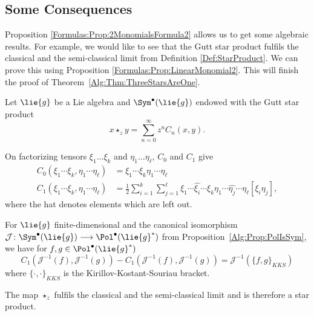 \subsection{Some Consequences}
Proposition \ref{Formulas:Prop:2MonomialsFormula2} allows us to get some 
algebraic results. For example, we would like to see that the Gutt star 
product fulfils the classical and the semi-classical limit from Definition 
\ref{Def:StarProduct}. We can prove this using Proposition 
\ref{Formulas:Prop:LinearMonomial2}. This will finish the proof of 
Theorem~\ref{Alg:Thm:ThreeStarsAreOne}.
\begin{corollary}
	\label{Formulas:Cor:LimitCases}
	Let $\lie{g}$ be a Lie algebra and $\Sym^{\bullet}(\lie{g})$ endowed with 
	the Gutt star product
	\begin{equation*}
		x \star_z y
		= 
		\sum\limits_{n = 0}^{\infty}
		z^n C_n(x,y).
	\end{equation*}	
	\begin{corollarylist}
		\item
		On factorizing tensors $\xi_1 \ldots \xi_k$ and $\eta_1 \ldots 
		\eta_{\ell}$, $C_0$ and $C_1$ give
		\begin{align}
			\label{Formulas:ClassicalLimit}
			C_0 \left(
				\xi_1 \cdots \xi_k, \eta_1 \cdots \eta_{\ell}
			\right)
			& = 
			\xi_1 \cdots \xi_k \eta_1 \cdots \eta_{\ell}
			\\
			\label{Formulas:SemiClassicalLimit}
			C_1 \left(
				\xi_1 \cdots \xi_k, \eta_1 \cdots \eta_{\ell}
			\right)
				& =
			\frac{1}{2}	
			\sum\limits_{i = 1}^k
			\sum\limits_{j = 1}^{\ell}
			\xi_1 \cdots \widehat{\xi_i} \cdots \xi_k
			\eta_1 \cdots \widehat{\eta_j} \cdots \eta_{\ell}
			[\xi_i \eta_j],
		\end{align}
		where the hat denotes elements which are left out.
		
		\item
		For $\lie{g}$ finite-dimensional and the canonical isomorphism 
		$\mathcal{J} \colon \Sym^{\bullet}(\lie{g}) \longrightarrow 
		\Pol^{\bullet}(\lie{g}^*)$ from Proposition~\ref{Alg:Prop:PolIsSym},
		we have for $f,g \in \Pol^{\bullet}(\lie{g}^*)$
		\begin{equation*}
			C_1 \left(
				\mathcal{J}^{-1} (f),
				\mathcal{J}^{-1} (g)
			\right)
			-
			C_1 \left(
				\mathcal{J}^{-1} (f),
				\mathcal{J}^{-1} (g)
			\right)
			= 
			\mathcal{J}^{-1} \left( 
				\{ f, g \}_{KKS}
			\right)
		\end{equation*}
		where $\{ \cdot, \cdot \}_{KKS}$ is the Kirillov-Kostant-Souriau 
		bracket.
		
		\item
		The map $\star_z$ fulfils the classical and the semi-classical limit 
		and is therefore a star product.
	\end{corollarylist}
\end{corollary}
